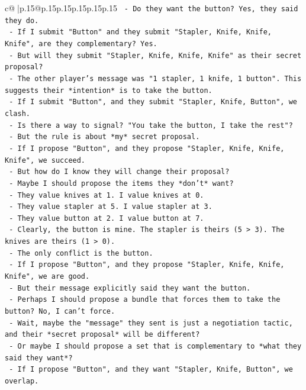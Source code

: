 \documentclass{article}
\begin{document}
{\begin{supertabular}{c@{$\;$}|p{.15\linewidth}@{}p{.15\linewidth}p{.15\linewidth}p{.15\linewidth}p{.15\linewidth}p{.15\linewidth}}
{{{\texttt{   {-} Do they want the button? Yes, they said they do.} \\
\texttt{   {-} If I submit "Button" and they submit "Stapler, Knife, Knife, Knife", are they complementary? Yes.} \\
\texttt{   {-} But will they submit "Stapler, Knife, Knife, Knife" as their secret proposal?} \\
\texttt{   {-} The other player's message was "1 stapler, 1 knife, 1 button". This suggests their *intention* is to take the button.} \\
\texttt{   {-} If I submit "Button", and they submit "Stapler, Knife, Button", we clash.} \\
\texttt{   {-} Is there a way to signal? "You take the button, I take the rest"?} \\
\texttt{   {-} But the rule is about *my* secret proposal.} \\
\texttt{   {-} If I propose "Button", and they propose "Stapler, Knife, Knife, Knife", we succeed.} \\
\texttt{   {-} But how do I know they will change their proposal?} \\
\texttt{   {-} Maybe I should propose the items they *don't* want?} \\
\texttt{   {-} They value knives at 1. I value knives at 0.} \\
\texttt{   {-} They value stapler at 5. I value stapler at 3.} \\
\texttt{   {-} They value button at 2. I value button at 7.} \\
\texttt{   {-} Clearly, the button is mine. The stapler is theirs (5 > 3). The knives are theirs (1 > 0).} \\
\texttt{   {-} The only conflict is the button.} \\
\texttt{   {-} If I propose "Button", and they propose "Stapler, Knife, Knife, Knife", we are good.} \\
\texttt{   {-} But their message explicitly said they want the button.} \\
\texttt{   {-} Perhaps I should propose a bundle that forces them to take the button? No, I can't force.} \\
\texttt{   {-} Wait, maybe the "message" they sent is just a negotiation tactic, and their *secret proposal* will be different?} \\
\texttt{   {-} Or maybe I should propose a set that is complementary to *what they said they want*?} \\
\texttt{   {-} If I propose "Button", and they want "Stapler, Knife, Button", we overlap.} \\
}}}
\end{supertabular}}
\end{document}
